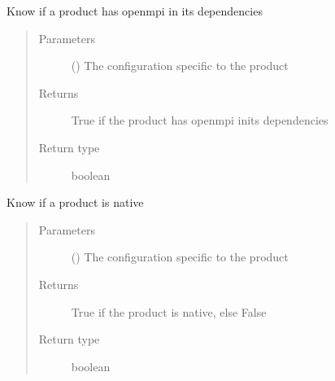\documentclass[a4paper,10pt,english]{sphinxmanual}
\begin{document}

\begin{fulllineitems}
\label{\detokenize{commands/apidoc/src:src.product.product_is_mpi}}
Know if a product has openmpi in its dependencies
\begin{quote}\begin{description}
\item[{Parameters}] \leavevmode
{} () \textendash{} The configuration specific to 
the product

\item[{Returns}] \leavevmode
True if the product has openmpi inits dependencies

\item[{Return type}] \leavevmode
boolean

\end{description}\end{quote}

\end{fulllineitems}


\begin{fulllineitems}
\label{\detokenize{commands/apidoc/src:src.product.product_is_native}}
Know if a product is native
\begin{quote}\begin{description}
\item[{Parameters}] \leavevmode
{} () \textendash{} The configuration specific to 
the product

\item[{Returns}] \leavevmode
True if the product is native, else False

\item[{Return type}] \leavevmode
boolean

\end{description}\end{quote}

\end{fulllineitems}
\end{document}
